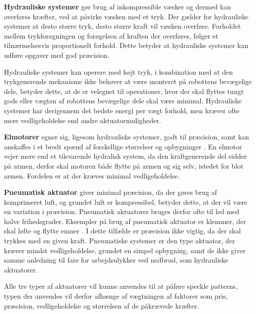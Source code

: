 \textbf{Hydrauliske systemer} gør brug af inkompressible væsker og dermed kan overføres kræfter, ved at påvirke væsken med et tryk. Der gælder for hydrauliske systemer at desto større tryk, desto større kraft vil væsken overføre. Forholdet mellem trykforøgningen og forøgelsen af kraften der overføres, følger et tilnærmelsesvis proportionelt forhold. Dette betyder at hydrauliske systemer kan udføre opgaver med god præcision.

Hydrauliske systemer kan operere med højt tryk, i kombination med at den trykgenerende mekanisme ikke behøver at være monteret på robottens bevægelige dele, betyder dette, at de er velegnet til operationer, hvor der skal flyttes tungt gods eller vægten af robottens bevægelige dele skal være minimal. Hydrauliske systemer har derigennem det bedste energi per vægt forhold, men kræver ofte mere vedligeholdelse end andre aktuatormuligheder. \parencite{Niku2020IntroductionApplications}

\textbf{Elmotorer} egner sig, ligesom hydrauliske systemer, godt til præcision, samt kan anskaffes i et bredt spænd af forskellige størrelser og opbygninger \parencite{Kakoty2024IntroductionRobotics}. En elmotor vejer mere end et tilsvarende hydralisk system, da den kraftgenerende del sidder på armen, derfor skal motoren både flytte på armen og sig selv, istedet for blot armen. Fordelen er at der kræves minimal vedligeholdelse.

\textbf{Pneumatisk aktuator} giver minimal præcision, da der gøres brug af komprimeret luft, og grundet luft er kompressibel, betyder dette, at der vil være en variation i præcision. Pneumatisk aktuatorer bruges derfor ofte til led med halve frihedsgrader. Eksempler på brug af pneumatisk aktuator er klemmer, der skal løfte og flytte emner \parencite{JHFOSTER2025IdealActuators}. I dette tilfælde er præcision ikke vigtig, da der skal trykkes med en given kraft. Pneumatiske systemer er den type aktuator, der kræver mindst vedligeholdelse, grundet en simpel opbygning, samt de ikke giver samme anledning til fare for arbejdsulykker ved nedbrud, som hydrauliske aktuatorer.

Alle tre typer af aktuatorer vil kunne anvendes til at påføre speckle patterns, typen der anvendes vil derfor afhænge af vægtningen af faktorer som pris, præcision, vedligeholdelse og størrelsen af de påkrævede kræfter.